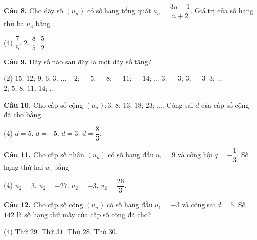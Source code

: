 \documentclass[12pt, a4paper]{article}
\newcommand{\cau}[1]{\vspace{0.12cm}\noindent\textbf{Câu #1. }}
\begin{document}
\cau{8} Cho dãy số $(u_n)$ có số hạng tổng quát $u_n = \dfrac{3n + 1}{n + 2}$. Giá trị của số hạng thứ ba $u_3$ bằng
\begin{tasks}(4)
\task $\dfrac{7}{5}$.
\task $2$.
\task $\dfrac{8}{5}$.
\task $\dfrac{5}{2}$.
\end{tasks}

\cau{9} Dãy số nào sau đây là một dãy số tăng?
\begin{tasks}(2)
\task $15;\, 12;\, 9;\, 6;\, 3;\,\dots$
\task $-2;\,-5;\,-8;\,-11;\,-14;\,\dots$
\task $3;\,-3;\, 3;\,-3;\, 3;\,\dots$
\task $2;\, 5;\, 8;\, 11;\, 14;\,\dots$
\end{tasks}

\cau{10} Cho cấp số cộng $(u_n)\colon 3;\, 8;\, 13;\, 18;\, 23;\,\dots$. Công sai $d$ của cấp số cộng đã cho bằng
\begin{tasks}(4)
\task $d = 5$.
\task $d = -5$.
\task $d = 3$.
\task $d = \dfrac{8}{3}$.
\end{tasks}

\cau{11} Cho cấp số nhân $(u_n)$ có số hạng đầu $u_1 = 9$ và công bội $q = -\dfrac{1}{3}$. Số hạng thứ hai $u_2$ bằng
\begin{tasks}(4)
\task $u_2 = 3$.
\task $u_2 = -27$.
\task $u_2 = -3$.
\task $u_2 = \dfrac{26}{3}$.
\end{tasks}

\cau{12} Cho cấp số cộng $(u_n)$ có số hạng đầu $u_1 = -3$ và công sai $d = 5$. Số $142$ là số hạng thứ mấy của cấp số cộng đã cho?
\begin{tasks}(4)
\task Thứ $29$.
\task Thứ $31$.
\task Thứ $28$.
\task Thứ $30$.
\end{tasks}
\end{document}
